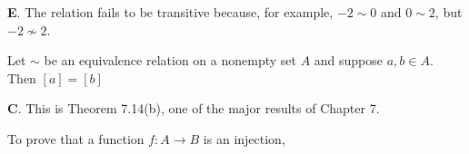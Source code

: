 \documentclass[addpoints]{exam}
\begin{document}
\begin{questions}
	
	\begin{solution}
		\textbf{E}. The relation fails to be transitive because, for example, $-2 \sim 0$ and $0 \sim 2$, but $-2 \not \sim 2$. 
	\end{solution}

\question[2] Let $\sim$ be an equivalence relation on a nonempty set $A$ and suppose $a, b \in A$. Then $[a] = [b]$
	
	\begin{solution}
		\textbf{C}. This is Theorem 7.14(b), one of the major results of Chapter 7. 
	\end{solution}

\question[2] To prove that a function $f: A \to B$  is an injection,
\end{questions}
\end{document}
